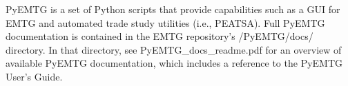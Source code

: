 
PyEMTG is a set of Python scripts that provide capabilities such as a \ac{GUI} for \ac{EMTG} and automated trade study utilities (i.e., \ac{PEATSA}). Full PyEMTG documentation is contained in the \ac{EMTG} repository's /PyEMTG/docs/ directory. In that directory, see PyEMTG\_docs\_readme.pdf for an overview of available PyEMTG documentation, which includes a reference to the PyEMTG User's Guide.